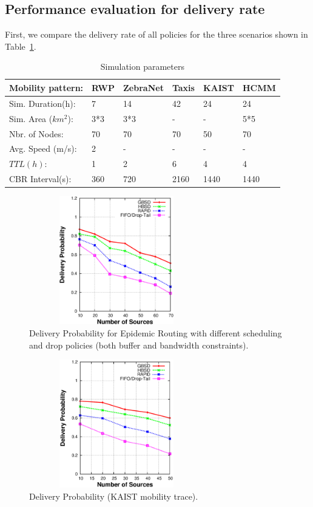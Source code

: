 \subsection{Performance evaluation for delivery rate}
\label{sec:sims:DR}

First, we compare the delivery rate of all
policies for the three scenarios shown in Table~\ref{SP}.

\begin{table}[!h]
\renewcommand{\arraystretch}{1.1}
\caption{Simulation parameters}
\centering
\begin{tabular}{|p{4cm}|p{1.5cm}|p{1.5cm}|p{1.5cm}|p{1.5cm}|p{1.5cm}|}
\hline
\bfseries Mobility pattern: & RWP & ZebraNet & Taxis & KAIST& HCMM \\
\hline
Sim. Duration(h):& 7 & 14 & 42 & 24 & 24\\
\hline
Sim. Area ($km^2$):& 3*3 & 3*3 & - & - & 5*5\\
\hline
Nbr. of Nodes: & 70 & 70 & 70 & 50 & 70\\
\hline
Avg. Speed (m/s):& 2 & - & - & - & -\\
\hline
$TTL(h)$:& 1 & 2 & 6 & 4 & 4\\
\hline
CBR Interval(s):& 360 & 720 & 2160 & 1440& 1440\\
\hline
\end{tabular}
\label{SP}
\end{table}

\begin{figure}[!h]
\centering
\includegraphics[width=3in,height=2.2in]{Chapitre3/fig2.eps}
\small
\caption{Delivery Probability for Epidemic Routing with different scheduling and drop policies (both buffer and bandwidth constraints).}\normalsize
\label{DR-RWP}
\end{figure}

\begin{figure}[!h]
\centering
\includegraphics[width=3in,height=2.2in]{Chapitre3/fig22.eps}
\small
\caption{Delivery Probability (KAIST mobility trace).}
\normalsize
\label{DR-KAIST}
\end{figure}

